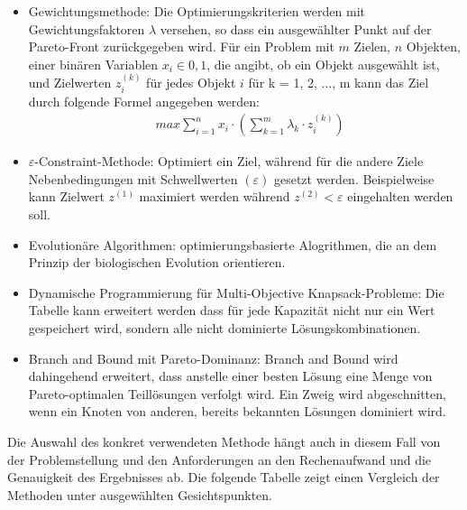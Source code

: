 \begin{itemize}
    \item Gewichtungsmethode: Die Optimierungskriterien werden mit Gewichtungsfaktoren $ \lambda $ versehen, so dass ein ausgewählter Punkt auf der Pareto-Front zurückgegeben wird. Für ein Problem mit $ m $ Zielen, $ n $ Objekten, einer binären Variablen $ x_i \in {0, 1} $, die angibt, ob ein Objekt ausgewählt ist, und Zielwerten $ z_i^{(k)} $ für jedes Objekt $ i $ für k = 1, 2, ..., m kann das Ziel durch folgende Formel angegeben werden:
        \begin{align}
            & max \sum_{i=1}^{n} x_i \cdot (\sum_{k=1}^{m} \lambda_k \cdot z_i^{(k)})
        \end{align}
    \item $ \varepsilon $-Constraint-Methode: Optimiert ein Ziel, während für die andere Ziele Nebenbedingungen mit Schwellwerten $(\varepsilon)$ gesetzt werden. Beispielweise kann Zielwert $ z^{(1)} $ maximiert werden während $ z^{(2)} < \varepsilon $ eingehalten werden soll.
    \item Evolutionäre Algorithmen: optimierungsbasierte Alogrithmen, die an dem Prinzip der biologischen Evolution orientieren. 
    \item Dynamische Programmierung für Multi-Objective Knapsack-Probleme: Die Tabelle kann erweitert werden dass für jede Kapazität nicht nur ein Wert gespeichert wird, sondern alle nicht dominierte Lösungskombinationen.
    \item Branch and Bound mit Pareto-Dominanz: Branch and Bound wird dahingehend erweitert, dass anstelle einer besten Lösung eine Menge von Pareto-optimalen Teillösungen verfolgt wird. Ein Zweig wird abgeschnitten, wenn ein Knoten von anderen, bereits bekannten Lösungen dominiert wird.
\end{itemize}

Die Auswahl des konkret verwendeten Methode hängt auch in diesem Fall von der Problemstellung und den Anforderungen an den Rechenaufwand und die Genauigkeit des Ergebnisses ab. Die folgende Tabelle zeigt einen Vergleich der Methoden unter ausgewählten Gesichtspunkten.

